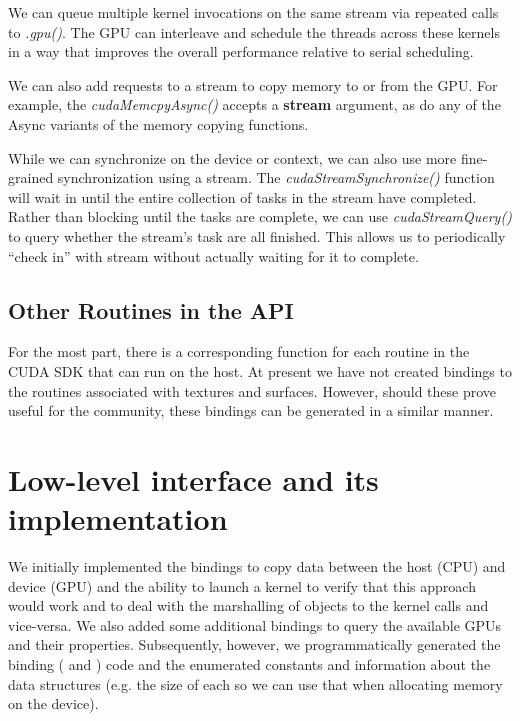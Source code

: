 \documentclass[article]{jss}
\newcommand{\note}[1]{\textbf{\textcolor{red}{#1}}}
\def\C{\proglang{C}}
\def\R{\proglang{R}}
\def\Rfunc#1{\textsl{#1()}}
\def\Rarg#1{\textbf{#1}}
\begin{document}
We can queue multiple kernel invocations on the same stream via
repeated calls to \Rfunc{.gpu}.  The GPU can interleave and schedule
the threads across these kernels in a way that improves the overall
performance relative to serial scheduling.

We can also add requests to a stream to copy memory to or from the
GPU.  For example, the \Rfunc{cudaMemcpyAsync} accepts a \Rarg{stream}
argument, as do any of the Async variants of the memory copying
functions.

While we can synchronize on the device or context, we can also use
more fine-grained synchronization using a stream. The
\Rfunc{cudaStreamSynchronize} function will wait in \R{} until the
entire collection of tasks in the stream have completed.  Rather than
blocking until the tasks are complete, we can use
\Rfunc{cudaStreamQuery} to query whether the stream's task are all
finished.  This allows us to periodically ``check in'' with stream
without actually waiting for it to complete.



\subsection{Other Routines in the API}

For the most part, there is a corresponding \R{} function for 
each routine in the CUDA SDK that can run on the host. At present 
we have not created bindings to the routines associated with textures
and surfaces. However, should these prove useful for the community, 
these bindings can be generated in a similar manner.







\section{Low-level interface and its implementation}
We initially implemented the bindings to copy data between the host
(CPU) and device (GPU) and the ability to launch a kernel to verify
that this approach would work and to deal with the marshalling of \R{}
objects to the kernel calls and vice-versa.  We also added some
additional bindings to query the available GPUs and their properties.
Subsequently, however, we programmatically generated the binding (\R{}
and \C) code and the enumerated constants and information about the
data structures (e.g. the size of each so we can use that when
allocating memory on the device).  
\end{document}
